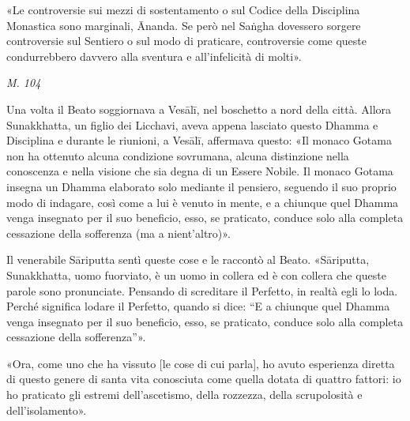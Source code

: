 «Le controversie sui mezzi di sostentamento o sul Codice della
Disciplina Monastica sono marginali, Ānanda. Se però nel Saṅgha
dovessero sorgere controversie sul Sentiero o sul modo di praticare,
controversie come queste condurrebbero davvero alla sventura e
all’infelicità di molti».


\emph{M. 104}


Una volta il Beato soggiornava a Vesālī, nel boschetto a nord della
città. Allora Sunakkhatta, un figlio dei Licchavi, aveva appena lasciato
questo Dhamma e Disciplina e durante le riunioni, a Vesālī, affermava
questo: «Il monaco Gotama non ha ottenuto alcuna condizione sovrumana,
alcuna distinzione nella conoscenza e nella visione che sia degna di un
Essere Nobile. Il monaco Gotama insegna un Dhamma elaborato solo
mediante il pensiero, seguendo il suo proprio modo di indagare, così
come a lui è venuto in mente, e a chiunque quel Dhamma venga insegnato
per il suo beneficio, esso, se praticato, conduce solo alla completa
cessazione della sofferenza (ma a nient’altro)».


Il venerabile Sāriputta sentì queste cose e le raccontò al Beato.
«Sāriputta, Sunakkhatta, uomo fuorviato, è un uomo in collera ed è con
collera che queste parole sono pronunciate. Pensando di screditare il
Perfetto, in realtà egli lo loda. Perché significa lodare il Perfetto,
quando si dice: “E a chiunque quel Dhamma venga insegnato per il suo
beneficio, esso, se praticato, conduce solo alla completa cessazione
della sofferenza”».


«Ora, come uno che ha vissuto [le cose di cui parla], ho avuto
esperienza diretta di questo genere di santa vita conosciuta come quella
dotata di quattro fattori: io ho praticato gli estremi dell’ascetismo,
della rozzezza, della scrupolosità e dell’isolamento».


